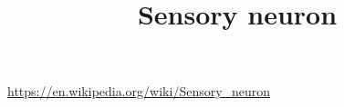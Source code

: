 \documentclass[a4paper]{article}
\title{Sensory neuron}
\date{}
\begin{document}
    \maketitle
    \url{https://en.wikipedia.org/wiki/Sensory_neuron}
\end{document}
